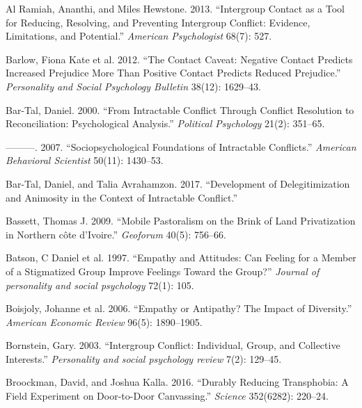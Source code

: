 \documentclass[11pt]{article}
\begin{document}
\leavevmode\hypertarget{ref-al2013intergroup}{}%
Al Ramiah, Ananthi, and Miles Hewstone. 2013. ``Intergroup Contact as a
Tool for Reducing, Resolving, and Preventing Intergroup Conflict:
Evidence, Limitations, and Potential.'' \emph{American Psychologist}
68(7): 527.

\leavevmode\hypertarget{ref-barlow2012contact}{}%
Barlow, Fiona Kate et al. 2012. ``The Contact Caveat: Negative Contact
Predicts Increased Prejudice More Than Positive Contact Predicts Reduced
Prejudice.'' \emph{Personality and Social Psychology Bulletin} 38(12):
1629--43.

\leavevmode\hypertarget{ref-bar2000intractable}{}%
Bar-Tal, Daniel. 2000. ``From Intractable Conflict Through Conflict
Resolution to Reconciliation: Psychological Analysis.'' \emph{Political
Psychology} 21(2): 351--65.

\leavevmode\hypertarget{ref-bar2007sociopsychological}{}%
---------. 2007. ``Sociopsychological Foundations of Intractable
Conflicts.'' \emph{American Behavioral Scientist} 50(11): 1430--53.

\leavevmode\hypertarget{ref-bar2017development}{}%
Bar-Tal, Daniel, and Talia Avrahamzon. 2017. ``Development of
Delegitimization and Animosity in the Context of Intractable Conflict.''

\leavevmode\hypertarget{ref-bassett2009mobile}{}%
Bassett, Thomas J. 2009. ``Mobile Pastoralism on the Brink of Land
Privatization in Northern côte d'Ivoire.'' \emph{Geoforum} 40(5):
756--66.

\leavevmode\hypertarget{ref-batson1997empathy}{}%
Batson, C Daniel et al. 1997. ``Empathy and Attitudes: Can Feeling for a
Member of a Stigmatized Group Improve Feelings Toward the Group?''
\emph{Journal of personality and social psychology} 72(1): 105.

\leavevmode\hypertarget{ref-boisjoly2006empathy}{}%
Boisjoly, Johanne et al. 2006. ``Empathy or Antipathy? The Impact of
Diversity.'' \emph{American Economic Review} 96(5): 1890--1905.

\leavevmode\hypertarget{ref-bornstein2003intergroup}{}%
Bornstein, Gary. 2003. ``Intergroup Conflict: Individual, Group, and
Collective Interests.'' \emph{Personality and social psychology review}
7(2): 129--45.

\leavevmode\hypertarget{ref-broockman2016durably}{}%
Broockman, David, and Joshua Kalla. 2016. ``Durably Reducing
Transphobia: A Field Experiment on Door-to-Door Canvassing.''
\emph{Science} 352(6282): 220--24.
\end{document}
